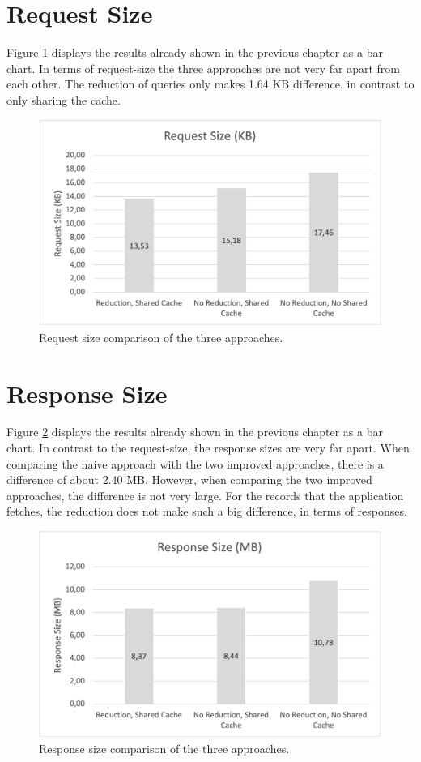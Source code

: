 \documentclass[MSE,Master,english]{twbook}%
\begin{document}
\section{Request Size}

Figure \ref{figure:discussion:request-size} displays the results already shown in the previous chapter as a bar chart. In terms of request-size the three approaches are not very far apart from each other. The reduction of queries only makes 1.64 KB difference, in contrast to only sharing the cache.

\ifshowImages
\begin{figure}[H]
\centering
\includegraphics[width=0.8\linewidth]{images/discussion/request-size.png}
\caption{Request size comparison of the three approaches.}\label{figure:discussion:request-size}
\end{figure}
\fi

\section{Response Size}

Figure \ref{figure:discussion:response-size} displays the results already shown in the previous chapter as a bar chart. In contrast to the request-size, the response sizes are very far apart. When comparing the naive approach with the two improved approaches, there is a difference of about 2.40 MB. However, when comparing the two improved approaches, the difference is not very large. For the records that the application fetches, the reduction does not make such a big difference, in terms of responses.

\ifshowImages
\begin{figure}[H]
\centering
\includegraphics[width=0.8\linewidth]{images/discussion/response-size.png}
\caption{Response size comparison of the three approaches.}\label{figure:discussion:response-size}
\end{figure}
\fi
\end{document}
